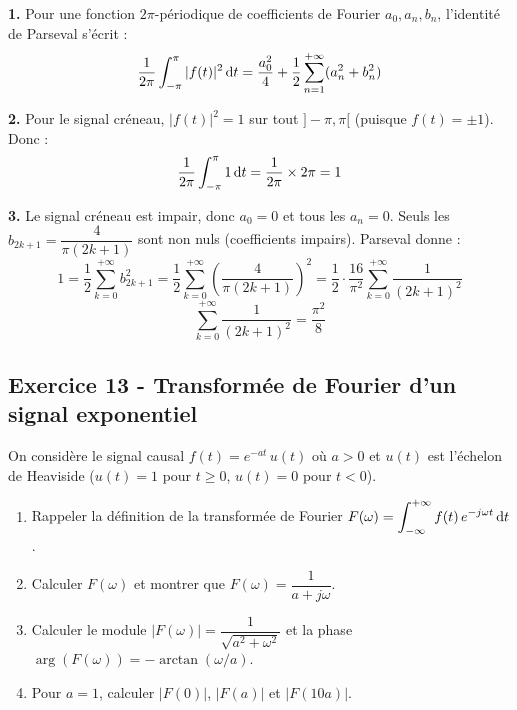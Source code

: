 \documentclass[12pt,a4paper]{article}
\begin{document}
\begin{boitecorrige}
\textbf{1.} Pour une fonction $2\pi$-périodique de coefficients de Fourier $a_0, a_n, b_n$, l'identité de Parseval s'écrit :
\[
\frac{1}{2\pi}\int_{-\pi}^{\pi}|f(t)|^2\,\mathrm{d} t = \frac{a_0^2}{4} + \frac{1}{2}\sum_{n=1}^{+\infty}(a_n^2+b_n^2)
\]

\textbf{2.} Pour le signal créneau, $|f(t)|^2 = 1$ sur tout $]-\pi,\pi[$ (puisque $f(t) = \pm 1$). Donc :
\[
\frac{1}{2\pi}\int_{-\pi}^{\pi} 1\,\mathrm{d} t = \frac{1}{2\pi}\times 2\pi = 1
\]

\textbf{3.} Le signal créneau est impair, donc $a_0 = 0$ et tous les $a_n = 0$. Seuls les $b_{2k+1} = \dfrac{4}{\pi(2k+1)}$ sont non nuls (coefficients impairs). Parseval donne :
\[
1 = \frac{1}{2}\sum_{k=0}^{+\infty}b_{2k+1}^2 = \frac{1}{2}\sum_{k=0}^{+\infty}\left(\frac{4}{\pi(2k+1)}\right)^2 = \frac{1}{2}\cdot\frac{16}{\pi^2}\sum_{k=0}^{+\infty}\frac{1}{(2k+1)^2}
\]
\[
\boxed{\sum_{k=0}^{+\infty}\frac{1}{(2k+1)^2} = \frac{\pi^2}{8}}
\]
\end{boitecorrige}

\subsection*{Exercice 13 - Transformée de Fourier d'un signal exponentiel \niveau{\moyen}}

\begin{boiteexercice}
On considère le signal causal $f(t) = e^{-at}\,u(t)$ où $a > 0$ et $u(t)$ est l'échelon de Heaviside ($u(t) = 1$ pour $t \geq 0$, $u(t) = 0$ pour $t < 0$).
\begin{enumerate}
  \item Rappeler la définition de la transformée de Fourier $F(\omega) = \displaystyle\int_{-\infty}^{+\infty} f(t)\,e^{-j\omega t}\,\mathrm{d} t$.
  \item Calculer $F(\omega)$ et montrer que $F(\omega) = \dfrac{1}{a + j\omega}$.
  \item Calculer le module $|F(\omega)| = \dfrac{1}{\sqrt{a^2+\omega^2}}$ et la phase $\arg(F(\omega)) = -\arctan(\omega/a)$.
  \item Pour $a = 1$, calculer $|F(0)|$, $|F(a)|$ et $|F(10a)|$.
\end{enumerate}
\end{boiteexercice}
\end{document}
